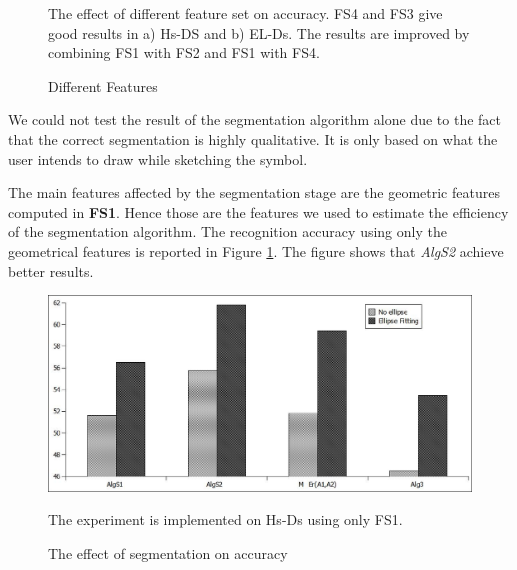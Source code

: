 \documentclass[preprint,10pt,5p,twocolumn]{elsarticle}
\begin{document}
 \begin{figure}
	\centering
	\caption{Different Features} The effect of different feature set on accuracy.  FS4 and FS3 give good results in a) Hs-DS and b) EL-Ds. The results are improved by combining FS1 with FS2 and FS1 with FS4.    %
\end{figure}  

 We could not test the result of the segmentation algorithm alone due to the fact that the correct segmentation is highly qualitative. It is only based on what the user intends to draw while sketching the symbol. 
 
 The main features affected by the segmentation stage are the geometric features computed in \textbf{FS1}. Hence those are the features we used to estimate the efficiency of the segmentation algorithm. The recognition accuracy using only the geometrical features is reported in Figure \ref{fig:testFeatonly}. The figure shows that \textsl{AlgS2} achieve better results.  
\begin{figure} 
	\centering
		\includegraphics[scale=0.45]{images/OnlyF1EL.jpg}
	\caption{The effect of segmentation on accuracy} The experiment is implemented on Hs-Ds using only FS1.  %
	\label{fig:testFeatonly}
\end{figure}  
\end{document}
